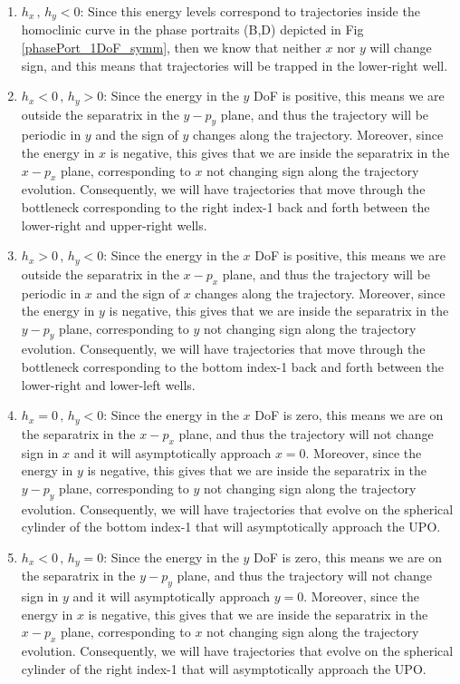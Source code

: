 \documentclass[10pt,aps,onecolumn,superscriptaddress]{revtex4-2}
\begin{document}
\begin{enumerate}
	\item \underline{$h_x \, , \, h_y < 0$}: Since this energy levels correspond to trajectories inside the homoclinic curve in the phase portraits (B,D) depicted in Fig \ref{phasePort_1DoF_symm}, then we know that neither $x$ nor $y$ will change sign, and this means that trajectories will be trapped in the lower-right well.
	
	\item \underline{$h_x < 0 \, , \, h_y > 0$}: Since the energy in the $y$ DoF is positive, this means we are outside the separatrix in the $y-p_y$ plane, and thus the trajectory will be periodic in $y$ and the sign of $y$ changes along the trajectory. Moreover, since the energy in $x$ is negative, this gives that we are inside the separatrix in the $x-p_x$ plane, corresponding to $x$ not changing sign along the trajectory evolution. Consequently, we will have trajectories that move through the bottleneck corresponding to the right index-1 back and forth between the lower-right and upper-right wells.
	
	\item \underline{$h_x > 0 \, , \, h_y < 0$}: Since the energy in the $x$ DoF is positive, this means we are outside the separatrix in the $x-p_x$ plane, and thus the trajectory will be periodic in $x$ and the sign of $x$ changes along the trajectory. Moreover, since the energy in $y$ is negative, this gives that we are inside the separatrix in the $y-p_y$ plane, corresponding to $y$ not changing sign along the trajectory evolution. Consequently, we will have trajectories that move through the bottleneck corresponding to the bottom index-1 back and forth between the lower-right and lower-left wells.
	
	\item \underline{$h_x = 0 \, , \, h_y < 0$}: Since the energy in the $x$ DoF is zero, this means we are on the separatrix in the $x-p_x$ plane, and thus the trajectory will not change sign in $x$ and it will asymptotically approach $x = 0$. Moreover, since the energy in $y$ is negative, this gives that we are inside the separatrix in the $y-p_y$ plane, corresponding to $y$ not changing sign along the trajectory evolution. Consequently, we will have trajectories that evolve on the spherical cylinder of the bottom index-1 that will asymptotically approach the UPO.
	
	\item \underline{$h_x < 0 \, , \, h_y = 0$}: Since the energy in the $y$ DoF is zero, this means we are on the separatrix in the $y-p_y$ plane, and thus the trajectory will not change sign in $y$ and it will asymptotically approach $y = 0$. Moreover, since the energy in $x$ is negative, this gives that we are inside the separatrix in the $x-p_x$ plane, corresponding to $x$ not changing sign along the trajectory evolution. Consequently, we will have trajectories that evolve on the spherical cylinder of the right index-1 that will asymptotically approach the UPO.
\end{enumerate}
\end{document}
